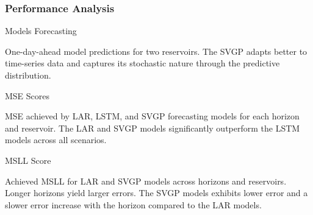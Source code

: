 \subsubsection{Performance Analysis}


\begin{frame}{Models Forecasting}
	\centering
	\begin{figure}[htbp]
		\tiny
		\setlength{} 
		\setlength{}
		
		\subfloat[$A$.]{}
		\subfloat[$I$.]{}
	\end{figure}
	\vspace{-1.5em}
	\begin{block}{}
	One-day-ahead model predictions for two reservoirs. The SVGP adapts better to time-series data and captures its stochastic nature through the predictive distribution.
	\end{block}
\end{frame}


\begin{frame}{MSE Scores}
	\begin{figure}[htbp]
		\setlength{} 
		\setlength{}
		\subfloat[LAR.]{}\hspace{-1.5em}
		\subfloat[LSTM.]{}\hspace{-1.5em}
		\subfloat[SVGP.]{}
	\end{figure}
	\vspace{-1.5em}
	\begin{block}{}
	MSE achieved by LAR, LSTM, and SVGP forecasting models for each horizon and reservoir. The LAR and SVGP models significantly outperform the LSTM models across all scenarios.
	\end{block}
\end{frame}

\begin{frame}{MSLL Score}
	\begin{figure}[htbp]
		\setlength{} 
		\setlength{}
		\subfloat[LAR.]{}\hspace{-1.5em}
		\subfloat[SVGP.]{}
	\end{figure}
	\vspace{-1.8em}
	\begin{block}{}
	Achieved MSLL for LAR and SVGP models across horizons and reservoirs. Longer horizons yield larger errors. The SVGP models exhibits lower error and a slower error increase with the horizon compared to the LAR models.
	\end{block}
\end{frame}

